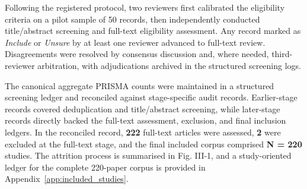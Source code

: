 Following the registered protocol, two reviewers first calibrated the eligibility criteria on a pilot sample of 50 records, then independently conducted title/abstract screening and full-text eligibility assessment. Any record marked as \textit{Include} or \textit{Unsure} by at least one reviewer advanced to full-text review. Disagreements were resolved by consensus discussion and, where needed, third-reviewer arbitration, with adjudications archived in the structured screening logs.

The canonical aggregate PRISMA counts were maintained in a structured screening ledger and reconciled against stage-specific audit records. Earlier-stage records covered deduplication and title/abstract screening, while later-stage records directly backed the full-text assessment, exclusion, and final inclusion ledgers. In the reconciled record, \textbf{222} full-text articles were assessed, \textbf{2} were excluded at the full-text stage, and the final included corpus comprised \textbf{N = 220} studies. The attrition process is summarised in Fig. III-1, and a study-oriented ledger for the complete 220-paper corpus is provided in Appendix~\ref{app:included_studies}.

